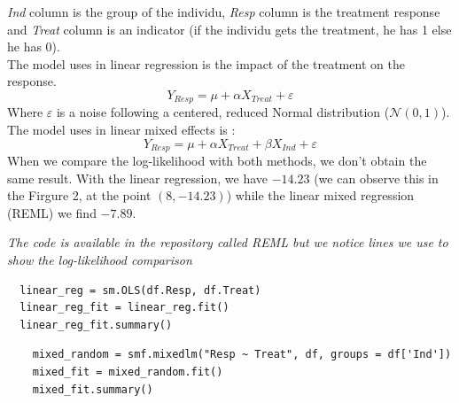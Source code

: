 \documentclass{article}
\begin{document}
\textit{Ind} column is the group of the individu, \textit{Resp} column is the treatment response and \textit{Treat} column is an indicator (if the individu gets the treatment, he has 1 else he has 0).\\
The model uses in linear regression is the impact of the treatment on the response.
\begin{equation*}
    Y_{Resp} = \mu +  \alpha X_{Treat} + \varepsilon
\end{equation*}
Where $\varepsilon$ is a noise following a centered, reduced Normal distribution ($\mathcal{N}(0, 1)$).\\
The model uses in linear mixed effects is :
\begin{equation*}
    Y_{Resp} = \mu + \alpha X_{Treat}  + \beta X_{Ind} +\varepsilon
\end{equation*}
When we compare the log-likelihood with both methods, we don't obtain the same result.
With the linear regression, we have $-14.23$ (we can observe this in the Firgure 2, at the point $(8, -14.23)$) while the linear mixed regression (REML) we find $-7.89$.\\
\begin{remark}
\textit{The code is available in the repository called REML but we notice lines we use to show the log-likelihood comparison}
\end{remark}
\begin{lstlisting}
  linear_reg = sm.OLS(df.Resp, df.Treat)
  linear_reg_fit = linear_reg.fit()
  linear_reg_fit.summary()
\end{lstlisting}
\begin{lstlisting}
    mixed_random = smf.mixedlm("Resp ~ Treat", df, groups = df['Ind'])
    mixed_fit = mixed_random.fit()
    mixed_fit.summary() 
\end{lstlisting}
\end{document}
